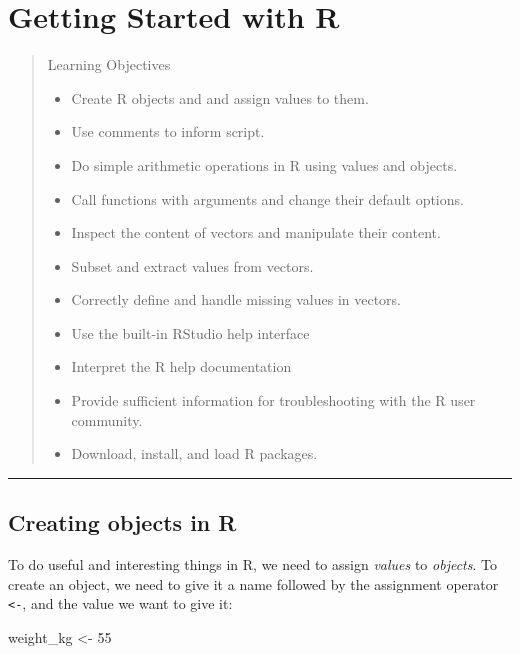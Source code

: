 \documentclass[]{book}
\newenvironment{Shaded}{\begin{snugshade}}{\end{snugshade}}
\newcommand{\DecValTok}[1]{\textcolor[rgb]{0.00,0.00,0.81}{{#1}}}
\newcommand{\StringTok}[1]{\textcolor[rgb]{0.31,0.60,0.02}{{#1}}}
\newcommand{\NormalTok}[1]{{#1}}
\providecommand{\tightlist}{%
  \setlength{\itemsep}{0pt}\setlength{\parskip}{0pt}}
\theoremstyle{definition}
\theoremstyle{definition}
\theoremstyle{remark}
\begin{document}
\chapter{Getting Started with R}\label{gettingstarted}

\begin{quote}
Learning Objectives

\begin{itemize}
\tightlist
\item
  Create R objects and and assign values to them.
\item
  Use comments to inform script.
\item
  Do simple arithmetic operations in R using values and objects.
\item
  Call functions with arguments and change their default options.
\item
  Inspect the content of vectors and manipulate their content.
\item
  Subset and extract values from vectors.
\item
  Correctly define and handle missing values in vectors.
\item
  Use the built-in RStudio help interface
\item
  Interpret the R help documentation
\item
  Provide sufficient information for troubleshooting with the R user
  community.
\item
  Download, install, and load R packages.
\end{itemize}
\end{quote}

\begin{center}\rule{0.5\linewidth}{\linethickness}\end{center}

\section{Creating objects in R}\label{creating-objects-in-r}

To do useful and interesting things in R, we need to assign
\emph{values} to \emph{objects}. To create an object, we need to give it
a name followed by the assignment operator \texttt{\textless{}-}, and
the value we want to give it:

\begin{Shaded}
\begin{Highlighting}[]
\NormalTok{weight_kg <-}\StringTok{ }\DecValTok{55}
\end{Highlighting}
\end{Shaded}
\end{document}
